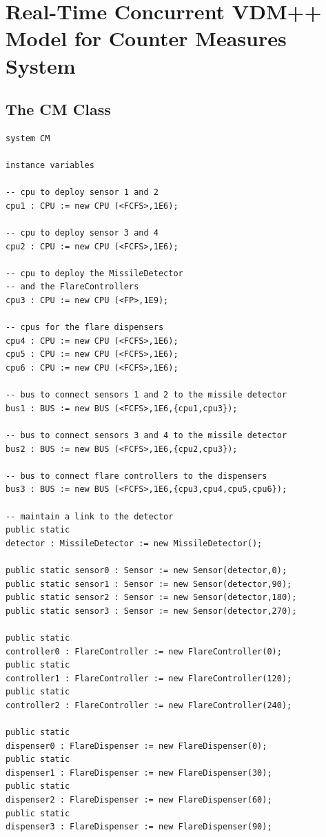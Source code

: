 \documentclass{overturerepchap}
\begin{document}
\section{Real-Time Concurrent VDM++ Model for Counter Measures System}

\subsection{The CM Class}

\begin{lstlisting}
system CM

instance variables

-- cpu to deploy sensor 1 and 2
cpu1 : CPU := new CPU (<FCFS>,1E6);

-- cpu to deploy sensor 3 and 4
cpu2 : CPU := new CPU (<FCFS>,1E6);

-- cpu to deploy the MissileDetector
-- and the FlareControllers
cpu3 : CPU := new CPU (<FP>,1E9);

-- cpus for the flare dispensers
cpu4 : CPU := new CPU (<FCFS>,1E6);
cpu5 : CPU := new CPU (<FCFS>,1E6);
cpu6 : CPU := new CPU (<FCFS>,1E6);

-- bus to connect sensors 1 and 2 to the missile detector
bus1 : BUS := new BUS (<FCFS>,1E6,{cpu1,cpu3});

-- bus to connect sensors 3 and 4 to the missile detector
bus2 : BUS := new BUS (<FCFS>,1E6,{cpu2,cpu3});
  
-- bus to connect flare controllers to the dispensers
bus3 : BUS := new BUS (<FCFS>,1E6,{cpu3,cpu4,cpu5,cpu6});

-- maintain a link to the detector
public static 
detector : MissileDetector := new MissileDetector();

public static sensor0 : Sensor := new Sensor(detector,0);
public static sensor1 : Sensor := new Sensor(detector,90);
public static sensor2 : Sensor := new Sensor(detector,180);
public static sensor3 : Sensor := new Sensor(detector,270);

public static 
controller0 : FlareController := new FlareController(0);
public static 
controller1 : FlareController := new FlareController(120);
public static 
controller2 : FlareController := new FlareController(240);

public static 
dispenser0 : FlareDispenser := new FlareDispenser(0);
public static 
dispenser1 : FlareDispenser := new FlareDispenser(30);
public static 
dispenser2 : FlareDispenser := new FlareDispenser(60);
public static 
dispenser3 : FlareDispenser := new FlareDispenser(90);


\end{lstlisting}
\end{document}
